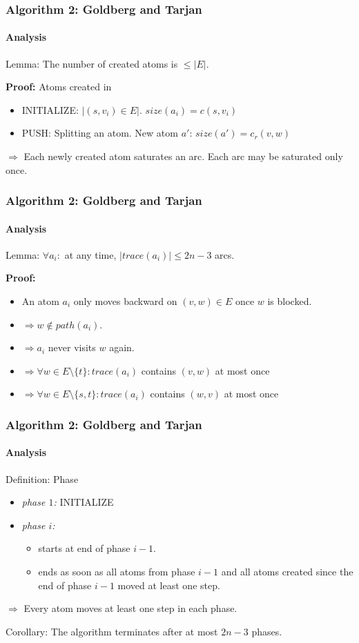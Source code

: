 \documentclass{beamer}
\begin{document}
\begin{frame}
\frametitle{Algorithm 2: Goldberg and Tarjan}
\framesubtitle{Analysis}
\begin{block}{Lemma:}
	The number of created atoms is $\leq \lvert E\rvert$.
\end{block}
\pause
\textbf{Proof:} Atoms created in \\
\begin{itemize}
	\item INITIALIZE: $\lvert (s,v_i) \in E \rvert$. $size(a_i) = c(s,v_i)$\\
	\item PUSH: Splitting an atom. New atom $a'$: $size(a') = c_r(v,w)$
\end{itemize}
\bigskip
\pause
$\Rightarrow$ Each newly created atom saturates an arc. Each arc may be saturated only once.
\end{frame}

\begin{frame}
\frametitle{Algorithm 2: Goldberg and Tarjan}
\framesubtitle{Analysis}
\begin{block}{Lemma:}
	$\forall a_i:$ at any time, $\lvert trace(a_i) \rvert \leq 2n-3$ arcs.
\end{block}
\pause
\textbf{Proof:} 
\begin{itemize}
	\item An atom $a_i$ only moves backward on $(v,w) \in E$ once $w$ is blocked.
	\item $\Rightarrow w \notin path(a_i)$.
	\item $\Rightarrow a_i$ never visits $w$ again.
	\item $\Rightarrow \forall w \in E \setminus \{t\}: trace(a_i)$ contains $(v,w)$ at most once
	\item $\Rightarrow \forall w \in E \setminus \{s,t\}: trace(a_i)$ contains $(w,v)$ at most once
\end{itemize}
\end{frame}

\begin{frame}
\frametitle{Algorithm 2: Goldberg and Tarjan}
\framesubtitle{Analysis}
\begin{block}{Definition: Phase}
	\begin{itemize}
		\item \textit{phase $1$:} INITIALIZE
		\item \textit{phase $i$:}
		\begin{itemize}
			\item starts at end of phase $i-1$.
			\item ends as soon as all atoms from phase $i-1$ and all atoms created since the end of phase $i-1$ moved at least one step.
		\end{itemize}
	\end{itemize}		
\end{block}
\bigskip
$\Rightarrow$ Every atom moves at least one step in each phase.
\pause
\begin{block}{Corollary:}
	The algorithm terminates after at most $2n - 3$ phases.
\end{block}
\end{frame}
\end{document}
